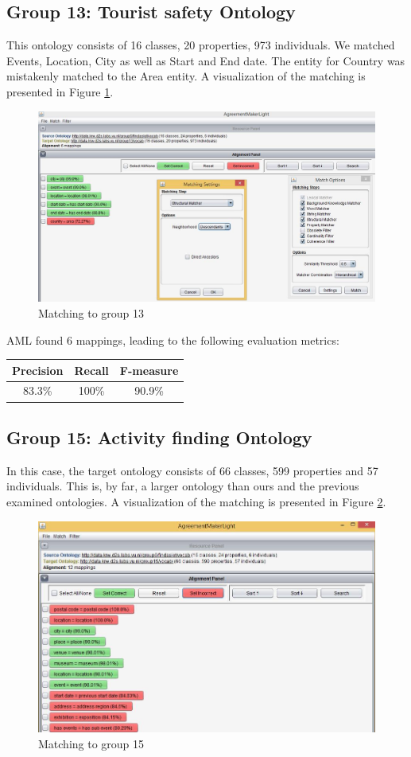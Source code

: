 \documentclass[runningheads,a4paper]{../../StyleFiles/llncs}
\begin{document}
\subsection{Group 13: Tourist safety Ontology}
This ontology consists of 16 classes, 20 properties, 973 individuals. We matched Events, Location, City as well as Start and End date. The entity for Country was mistakenly matched to the Area entity. A visualization of the matching is presented in Figure \ref{fig:match_g13}.

\begin{figure}[h]\centering
	\includegraphics[width=.7\textwidth]{img/match_g13.png}
	\caption{Matching to group 13}
	\label{fig:match_g13}
\end{figure}

AML found 6 mappings, leading to the following evaluation metrics: 

\begin{center}
	\begin{tabular}{| c | c | c |}
		\hline
		\textbf{Precision} & \textbf{Recall} & \textbf{F-measure} \\ \hline
		83.3\% & 100\% & 90.9\% \\ \hline
	\end{tabular}
\end{center}

\subsection{Group 15: Activity finding Ontology}
In this case, the target ontology consists of 66 classes, 599 properties and 57 individuals. This is, by far, a larger ontology than ours and the previous examined ontologies. A visualization of the matching is presented in Figure \ref{fig:match_g15}.

\begin{figure}[h]\centering
	\includegraphics[width=.7\textwidth]{img/match_g15.png}
	\caption{Matching to group 15}
	\label{fig:match_g15}
\end{figure}
\end{document}
